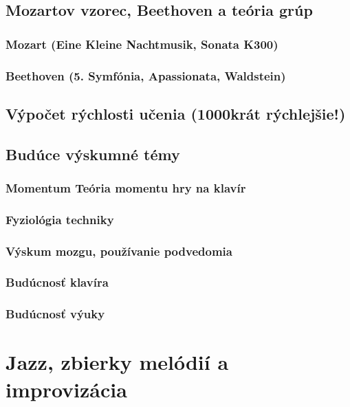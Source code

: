 \subsection{Mozartov vzorec, Beethoven a teória grúp}

\subsubsection{Mozart (Eine Kleine Nachtmusik, Sonata K300)}

\subsubsection{Beethoven (5. Symfónia, Apassionata, Waldstein)}

\subsection{Výpočet rýchlosti učenia (1000krát rýchlejšie!)}

\subsection{Budúce výskumné témy}

\subsubsection{Momentum Teória momentu hry na klavír}

\subsubsection{Fyziológia techniky}

\subsubsection{Výskum mozgu, používanie podvedomia}

\subsubsection{Budúcnosť klavíra}

\subsubsection{Budúcnosť výuky}

\section{Jazz, zbierky melódií a improvizácia}

